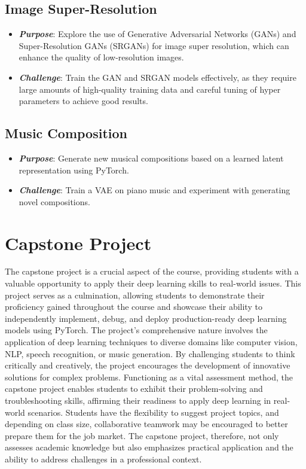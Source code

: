\documentclass[
]{book}
\begin{document}
\hypertarget{Image_Super_Resolution}{%
\section{Image Super-Resolution}\label{Image_Super_Resolution}}

\begin{itemize}
\item
  \textbf{\emph{Purpose}}: Explore the use of Generative Adversarial Networks (GANs) and Super-Resolution GANs (SRGANs) for image super resolution, which can enhance the quality of low-resolution images.
\item
  \textbf{\emph{Challenge}}: Train the GAN and SRGAN models effectively, as they require large amounts of high-quality training data and careful tuning of hyper parameters to achieve good results.
\end{itemize}

\hypertarget{Music_Composition}{%
\section{Music Composition}\label{Music_Composition}}

\begin{itemize}
\item
  \textbf{\emph{Purpose}}: Generate new musical compositions based on a learned latent representation using PyTorch.
\item
  \textbf{\emph{Challenge}}: Train a VAE on piano music and experiment with generating novel compositions.
\end{itemize}

\hypertarget{capstone-project-1}{%
\chapter{Capstone Project}\label{capstone-project-1}}

The capstone project is a crucial aspect of the course, providing students with a valuable opportunity to apply their deep learning skills to real-world issues. This project serves as a culmination, allowing students to demonstrate their proficiency gained throughout the course and showcase their ability to independently implement, debug, and deploy production-ready deep learning models using PyTorch. The project's comprehensive nature involves the application of deep learning techniques to diverse domains like computer vision, NLP, speech recognition, or music generation. By challenging students to think critically and creatively, the project encourages the development of innovative solutions for complex problems. Functioning as a vital assessment method, the capstone project enables students to exhibit their problem-solving and troubleshooting skills, affirming their readiness to apply deep learning in real-world scenarios. Students have the flexibility to suggest project topics, and depending on class size, collaborative teamwork may be encouraged to better prepare them for the job market. The capstone project, therefore, not only assesses academic knowledge but also emphasizes practical application and the ability to address challenges in a professional context.
\end{document}
